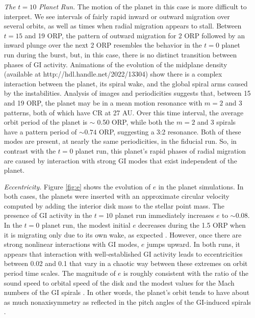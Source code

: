 \documentclass[12pt,manuscript,authoryear]{aastex}
\begin{document}
{\it The $t = 10$ Planet Run.} The motion of the planet in this case is more difficult to interpret. We see intervals of fairly rapid inward or outward migration over several orbits, as well as times when radial migration appears to stall. Between $t = 15$ and 19 ORP, the pattern of outward migration for 2 ORP followed by an inward plunge over the next 2 ORP resembles the behavior in the $t = 0$ planet run during the burst, but, in this case, there is no distinct transition between phases of GI activity. Animations of the evolution of the midplane density (available at http://hdl.handle.net/2022/13304) show there is a complex interaction between the planet, its spiral wake, and the global spiral arms caused by the instabilities. Analysis of images and periodicities suggests that, between 15 and 19 ORP, the planet may be in a mean motion resonance with $m = 2$ and 3 patterns, both of which have CR at 27 AU. Over this time interval, the average orbit period of the planet is $\sim$ 0.50 ORP, while both the $m = 2$ and 3 spirals have a pattern period of $\sim 0.74$ ORP, suggesting a 3:2 resonance. Both of these modes are present, at nearly the same periodicities, in the fiducial run. So, in contrast with the $t = 0$ planet run, this planet's rapid phases of radial migration are caused by interaction with strong GI modes that exist independent of the planet.

{\it Eccentricity.} Figure \ref{fig:e} shows the evolution of $e$ in the planet simulations. In both cases, the planets were inserted with an approximate circular velocity computed by adding the interior disk mass to the stellar point mass. The presence of GI activity in the $t = 10$ planet run immediately increases $e$ to $\sim 0.08$. In the $t = 0$ planet run, the modest initial $e$ decreases during the 1.5 ORP when it is migrating only due to its own wake, as expected \citep{ward1998,ward2003,goldreich2004}. 
However, once there are strong nonlinear interactions with GI modes, $e$ jumps upward. In both runs, it appears that interaction with well-established GI activity leads to eccentricities between 0.02 and 0.1 that vary in a chaotic way between these extremes on orbit period time scales. The magnitude of $e$ is roughly consistent with the ratio of the sound speed to orbital speed of the disk and the modest values for the Mach numbers of the GI spirals \citep{boley2006a,boley2008}. In other words, the planet's orbit tends to have about as much nonaxisymmetry as reflected in the pitch angles of the GI-induced spirals \citep{cossins2009}.
\end{document}
